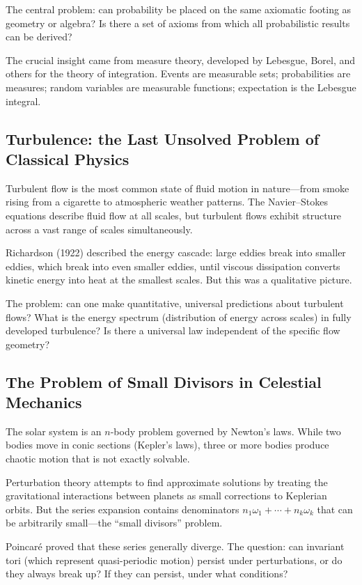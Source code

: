 The central problem: can probability be placed on the same axiomatic footing as geometry or algebra? Is there a set of axioms from which all probabilistic results can be derived?

The crucial insight came from measure theory, developed by Lebesgue, Borel, and others for the theory of integration. Events are measurable sets; probabilities are measures; random variables are measurable functions; expectation is the Lebesgue integral.

\subsection{Turbulence: the Last Unsolved Problem of Classical Physics}

Turbulent flow is the most common state of fluid motion in nature---from smoke rising from a cigarette to atmospheric weather patterns. The Navier--Stokes equations describe fluid flow at all scales, but turbulent flows exhibit structure across a vast range of scales simultaneously.

Richardson (1922) described the energy cascade: large eddies break into smaller eddies, which break into even smaller eddies, until viscous dissipation converts kinetic energy into heat at the smallest scales. But this was a qualitative picture.

The problem: can one make quantitative, universal predictions about turbulent flows? What is the energy spectrum (distribution of energy across scales) in fully developed turbulence? Is there a universal law independent of the specific flow geometry?

\subsection{The Problem of Small Divisors in Celestial Mechanics}

The solar system is an $n$-body problem governed by Newton's laws. While two bodies move in conic sections (Kepler's laws), three or more bodies produce chaotic motion that is not exactly solvable.

Perturbation theory attempts to find approximate solutions by treating the gravitational interactions between planets as small corrections to Keplerian orbits. But the series expansion contains denominators $n_1\omega_1 + \cdots + n_k\omega_k$ that can be arbitrarily small—the ``small divisors'' problem.

Poincar{\'e} proved that these series generally diverge. The question: can invariant tori (which represent quasi-periodic motion) persist under perturbations, or do they always break up? If they can persist, under what conditions?

